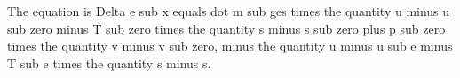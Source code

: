 The equation is Delta e sub x equals dot m sub ges times the quantity u minus u sub zero minus T sub zero times the quantity s minus s sub zero plus p sub zero times the quantity v minus v sub zero, minus the quantity u minus u sub e minus T sub e times the quantity s minus s.